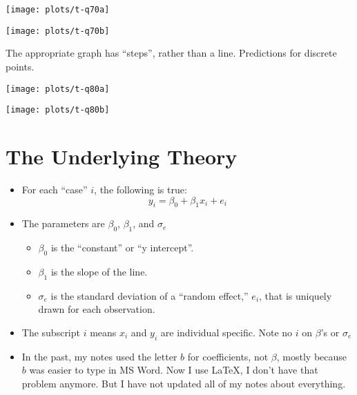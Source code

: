 \documentclass[10pt,english]{beamer}
\def\lyxframeend{} %
\begin{document}
\lyxframeend{}


\texttt{[image: plots/t-q70a]}


\lyxframeend{}


\texttt{[image: plots/t-q70b]}

The appropriate graph has ``steps'', rather than a line. Predictions
for discrete points.


\lyxframeend{}


\texttt{[image: plots/t-q80a]}


\lyxframeend{}


\texttt{[image: plots/t-q80b]}


\lyxframeend{}\section{The Underlying Theory}


\lyxframeend{}
\begin{itemize}
\item For each ``case'' $i$, the following is true: 
\begin{equation}
y_{i}=\beta_{0}+\beta_{1}x_{i}+e_{i}\label{eq:linearModel}
\end{equation}

\item The \alert{parameters} are $\beta_{0}$, $\beta_{1}$, and $\sigma_{e}$

\begin{itemize}
\item $\beta_{0}$ is the ``constant'' or ``y intercept''. 
\item $\beta_{1}$ is the slope of the line.
\item $\sigma_{e}$ is the standard deviation of a ``random effect,''
$e_{i}$, that is uniquely drawn for each observation.
\end{itemize}
\item The subscript $i$ means $x_{i}$ and $y_{i}$ are individual specific.
Note no $i$ on $\beta$'s or $\sigma_{e}$
\item In the past, my notes used the letter $b$ for coefficients, not $\beta$,
mostly because $b$ was easier to type in MS Word. Now I use \LaTeX{},
I don't have that problem anymore. But I have not updated all of my
notes about everything.
\end{itemize}
\end{document}
